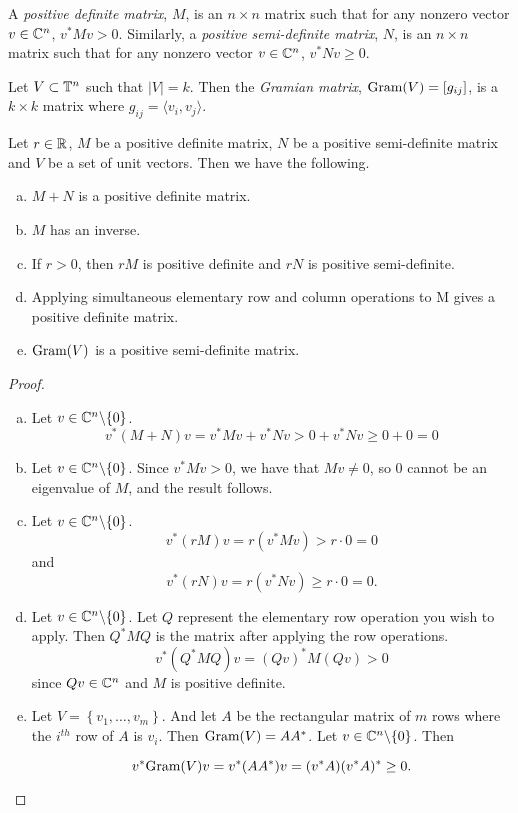 \begin{definition} \label{def:pos-def-matrix}
 A {\it positive definite matrix}, $M$, is an $n \times n$ matrix such that for any nonzero vector $v \in \mathbb{C}^n$, $v^*Mv > 0$. Similarly, a {\it positive semi-definite matrix}, $N$, is an $n \times n$ matrix such that for any nonzero vector $v \in \mathbb{C}^n$, $v^*Nv \geq 0$.
\end{definition}

\begin{definition} \label{def:gram}
 Let $V \subset \mathbb{T}^n$ such that $|V| = k$. Then the {\it Gramian matrix}, $\text{Gram}(V) = [g_{ij}]$, is a $k \times k$ matrix where $g_{ij} = \langle v_i,v_j \rangle$.
\end{definition}


\begin{lemma} \label{lem:pos-def-stuff}
 Let $r \in \mathbb{R}$, $M$ be a positive definite matrix, $N$ be a positive semi-definite matrix and $V$ be a set of unit vectors. Then we have the following.

 \begin{enumerate}[(a)]
  \item $M+N$ is a positive definite matrix.
  \item $M$ has an inverse.
  \item If $r > 0$, then $rM$ is positive definite and $rN$ is positive semi-definite.
  \item Applying simultaneous elementary row and column operations to M gives a positive definite matrix.
  \item $\text{Gram}(V)$ is a positive semi-definite matrix.
 \end{enumerate}


 \begin{proof}
  \begin{enumerate}[(a)]
   \item Let $v \in \mathbb{C}^n {\setminus \{0\}}$. $$v^*(M+N)v = v^*Mv + v^*Nv > 0 + v^*Nv \geq 0 + 0 = 0$$
   \item Let $v \in \mathbb{C}^n {\setminus \{0\}}$. Since $v^*Mv > 0$, we have that $Mv \neq 0$, so $0$ cannot be an eigenvalue of $M$, and the result follows.
   \item Let $v \in \mathbb{C}^n {\setminus \{0\}}$. $$v^*(rM)v = r(v^*Mv) > r\cdot0 = 0$$ and $$v^*(rN)v = r(v^*Nv) \geq r\cdot0 = 0.$$
   \item Let $v \in \mathbb{C}^n {\setminus \{0\}}$. Let $Q$ represent the elementary row operation you wish to apply. Then $Q^*MQ$ is the matrix after applying the row operations. $$v^*(Q^*MQ)v = (Qv)^*M(Qv) > 0$$ since $Qv \in \mathbb{C}^n$ and $M$ is positive definite.
   \item Let $V = \left\{v_1,\dots,v_m\right\}$. And let $A$ be the rectangular matrix of $m$ rows where the $i^{th}$ row of $A$ is $v_i$. Then $\text{Gram}(V) = AA^*$. Let $v \in \mathbb{C}^n{\setminus \{0\}}$. Then

$$v^*\text{Gram}(V)v = v^*(AA^*)v=(v^*A)(v^*A)^* \geq 0.$$
  \end{enumerate}

 \end{proof}

\end{lemma}

